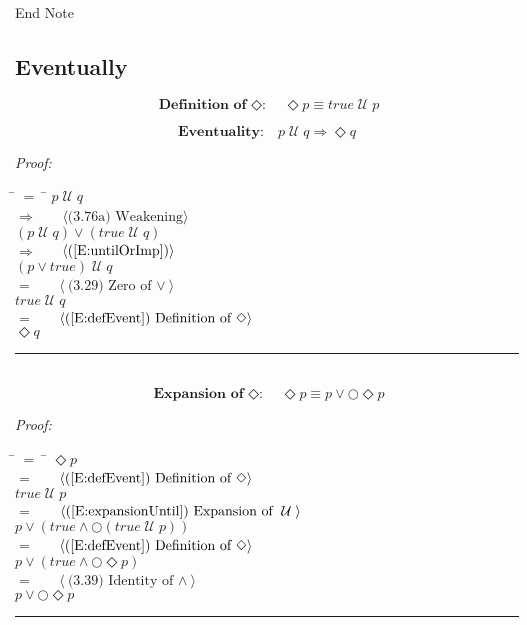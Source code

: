 \documentclass[fleqn, leqno]{article}
\newcommand{\lgap}{2pt}                             %
\newcommand{\mymathindent}{24pt}                      %
\newcommand{\Until}{\;\mathcal{U}\;}
\newcommand{\Next}{\bigcirc}
\newcommand{\Event}{\Diamond}
\newcommand{\myqed}{\hfill\rule[-.23ex]{1.2ex}{2.0ex}}
\newcommand{\Gll} {\langle}                         %
\newcommand{\Ggg} {\rangle}                         %
\newcommand{\Hint}[1]     {\ \ \ $\Gll              \mbox{#1} \Ggg$ }   %
\begin{document}
End Note\\

\subsection{Eventually}

\begin{equation}\label{E:defEvent}
\textbf{Definition of $\Event$:}\quad \Event p \equiv true \Until p
\end{equation}

\begin{equation}\label{E:eventuality}
\textbf{Eventuality:}\quad p \Until q \Rightarrow \Event q
\end{equation}

\emph{Proof:}
\begin{tabbing}
\hspace{\mymathindent} \= $= \;$ \= \kill
  \> \>   $p \Until q$\\[\lgap]
  \> $\Rightarrow$  \>  \Hint{(3.76a) Weakening}\\[\lgap]
  \> \>   $(p \Until q) \lor (true \Until q)$\\[\lgap]
  \> $\Rightarrow$  \>  \Hint{(\ref{E:untilOrImp})}\\[\lgap]
  \> \>   $(p \lor true) \Until q$\\[\lgap]
  \> $=$  \>  \Hint{(3.29) Zero of $\lor$}\\[\lgap]
  \> \>   $true \Until q$\\[\lgap]
  \> $=$  \>  \Hint{(\ref{E:defEvent}) Definition of $\Event$}\\[\lgap]
  \> \>   $\Event q$\\[\lgap]
\end{tabbing}
\myqed\\[\lgap]


\begin{equation}\label{E:expansionEvent}
\textbf{Expansion of $\Event$:}\quad \Event p \equiv p \lor \Next\Event p
\end{equation}

\emph{Proof:}
\begin{tabbing}
\hspace{\mymathindent} \= $= \;$ \= \kill
  \> \>   $\Event p$\\[\lgap]
  \> $=$  \>  \Hint{(\ref{E:defEvent}) Definition of $\Event$}\\[\lgap]
  \> \>   $true \Until p$\\[\lgap]
  \> $=$  \>  \Hint{(\ref{E:expansionUntil}) Expansion of $\Until$}\\[\lgap]
  \> \>   $p \lor (true \land \Next(true \Until p))$\\[\lgap]
  \> $=$  \>  \Hint{(\ref{E:defEvent}) Definition of $\Event$}\\[\lgap]
  \> \>   $p \lor (true \land \Next\Event p)$\\[\lgap]
  \> $=$  \>  \Hint{(3.39) Identity of $\land$}\\[\lgap]
  \> \>   $p \lor \Next\Event p$\\[\lgap]
\end{tabbing}
\myqed\\[\lgap]
\end{document}
